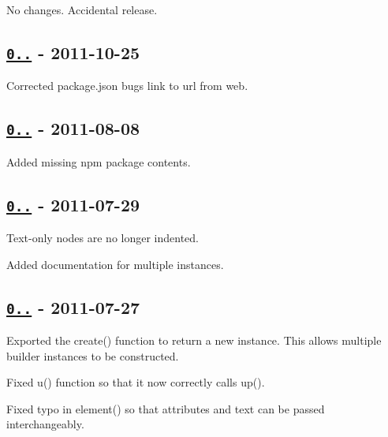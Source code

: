\begin{DoxyItemize}
\item No changes. Accidental release.
\end{DoxyItemize}

\subsection*{\href{https://github.com/oozcitak/xmlbuilder-js/compare/v0.1.5...v0.1.6}{\tt 0..} -\/ 2011-\/10-\/25}


\begin{DoxyItemize}
\item Corrected {\ttfamily package.\+json} bugs link to {\ttfamily url} from {\ttfamily web}.
\end{DoxyItemize}

\subsection*{\href{https://github.com/oozcitak/xmlbuilder-js/compare/v0.1.4...v0.1.5}{\tt 0..} -\/ 2011-\/08-\/08}


\begin{DoxyItemize}
\item Added missing npm package contents.
\end{DoxyItemize}

\subsection*{\href{https://github.com/oozcitak/xmlbuilder-js/compare/v0.1.3...v0.1.4}{\tt 0..} -\/ 2011-\/07-\/29}


\begin{DoxyItemize}
\item Text-\/only nodes are no longer indented.
\item Added documentation for multiple instances.
\end{DoxyItemize}

\subsection*{\href{https://github.com/oozcitak/xmlbuilder-js/compare/v0.1.2...v0.1.3}{\tt 0..} -\/ 2011-\/07-\/27}


\begin{DoxyItemize}
\item Exported the {\ttfamily create()} function to return a new instance. This allows multiple builder instances to be constructed.
\item Fixed {\ttfamily u()} function so that it now correctly calls {\ttfamily up()}.
\item Fixed typo in {\ttfamily element()} so that {\ttfamily attributes} and {\ttfamily text} can be passed interchangeably.
\end{DoxyItemize}

